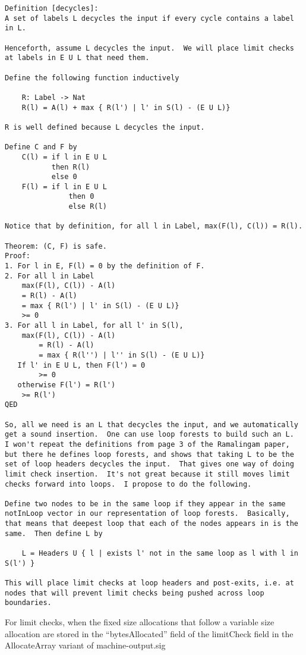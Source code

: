 \begin{verbatim}
Definition [decycles]:
A set of labels L decycles the input if every cycle contains a label
in L.

Henceforth, assume L decycles the input.  We will place limit checks
at labels in E U L that need them.

Define the following function inductively

	R: Label -> Nat
	R(l) = A(l) + max { R(l') | l' in S(l) - (E U L)}

R is well defined because L decycles the input.

Define C and F by
	C(l) = if l in E U L
	       then R(l)
	       else 0
	F(l) = if l in E U L
               then 0
               else R(l)

Notice that by definition, for all l in Label, max(F(l), C(l)) = R(l).

Theorem: (C, F) is safe.
Proof:
1. For l in E, F(l) = 0 by the definition of F.
2. For all l in Label
	max(F(l), C(l)) - A(l)
	= R(l) - A(l)
	= max { R(l') | l' in S(l) - (E U L)}
	>= 0
3. For all l in Label, for all l' in S(l),
   	max(F(l), C(l)) - A(l)
        = R(l) - A(l)
        = max { R(l'') | l'' in S(l) - (E U L)}
   If l' in E U L, then F(l') = 0
        >= 0
   otherwise F(l') = R(l')
	>= R(l')
QED

So, all we need is an L that decycles the input, and we automatically
get a sound insertion.  One can use loop forests to build such an L.
I won't repeat the definitions from page 3 of the Ramalingam paper,
but there he defines loop forests, and shows that taking L to be the
set of loop headers decycles the input.  That gives one way of doing
limit check insertion.  It's not great because it still moves limit
checks forward into loops.  I propose to do the following.

Define two nodes to be in the same loop if they appear in the same
notInLoop vector in our representation of loop forests.  Basically,
that means that deepest loop that each of the nodes appears in is the
same.  Then define L by

	L = Headers U { l | exists l' not in the same loop as l with l in S(l') }

This will place limit checks at loop headers and post-exits, i.e. at
nodes that will prevent limit checks being pushed across loop
boundaries.
\end{verbatim}



For limit checks, when the fixed size allocations that follow a variable size
allocation are stored in the ``bytesAllocated'' field of the limitCheck field in
the AllocateArray variant of machine-output.sig
